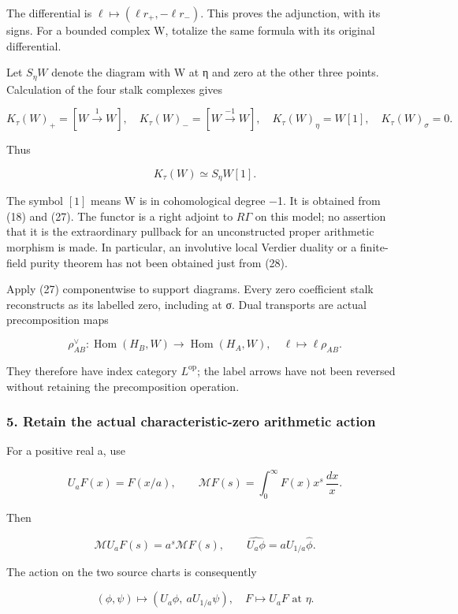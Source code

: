 The differential is \(\ell\mapsto(\ell r_+,-\ell r_-)\). This proves the adjunction, with its signs. For a bounded complex W, totalize the same formula with its original differential.

Let \(S_\eta W\) denote the diagram with W at η and zero at the other three points. Calculation of the four stalk complexes gives

\[
K_\tau(W)_+=[W\xrightarrow{1}W],\quad
K_\tau(W)_-=[W\xrightarrow{-1}W],\quad
K_\tau(W)_\eta=W[1],\quad K_\tau(W)_\sigma=0.
\tag{29}
\]

Thus

\[
\boxed{K_\tau(W)\simeq S_\eta W[1].}
\tag{30}
\]

The symbol \([1]\) means W is in cohomological degree −1. It is obtained from (18) and (27). The functor is a right adjoint to \(R\Gamma\) on this model; no assertion that it is the extraordinary pullback for an unconstructed proper arithmetic morphism is made. In particular, an involutive local Verdier duality or a finite-field purity theorem has not been obtained just from (28).

Apply (27) componentwise to support diagrams. Every zero coefficient stalk reconstructs as its labelled zero, including at σ. Dual transports are actual precomposition maps

\[
\rho_{AB}^{\vee}:\operatorname{Hom}(H_B,W)\longrightarrow
\operatorname{Hom}(H_A,W),\quad\ell\mapsto\ell\rho_{AB}.
\tag{31}
\]

They therefore have index category \(L^{\mathrm{op}}\); the label arrows have not been reversed without retaining the precomposition operation.

\subsubsection{5. Retain the actual characteristic-zero arithmetic action}\label{endpoint-tau_base--retain-the-actual-characteristic-zero-arithmetic-action}

For a positive real a, use

\[
U_aF(x)=F(x/a),\qquad
\mathcal M F(s)=\int_0^\infty F(x)x^s\,\frac{dx}{x}.
\tag{32}
\]

Then

\[
\mathcal M U_aF(s)=a^s\mathcal MF(s),\qquad
\widehat{U_a\phi}=aU_{1/a}\widehat\phi.
\tag{33}
\]

The action on the two source charts is consequently

\[
(\phi,\psi)\longmapsto(U_a\phi,\ aU_{1/a}\psi),
\quad
F\longmapsto U_aF\text{ at }\eta.
\tag{34}
\]


